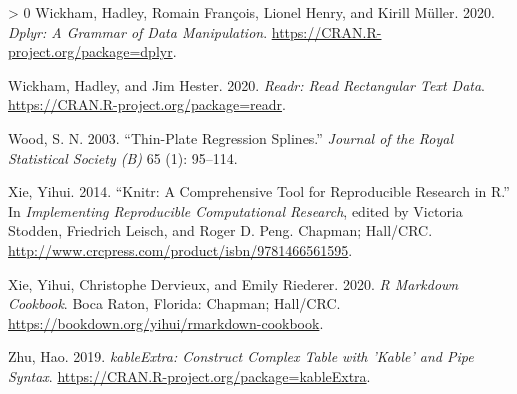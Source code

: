 \documentclass[12pt]{article}
\newlength{\cslhangindent}
\newenvironment{CSLReferences}[3] %
 {%
  \setlength{\parindent}{0pt}
  \ifodd #1 \everypar{\setlength{\hangindent}{\cslhangindent}}\ignorespaces\fi
  \ifnum #2 > 0
  \setlength{\parskip}{#2\baselineskip}
  \fi
 }%
 {}
\begin{document}
\begin{CSLReferences}{1}{0}
\leavevmode\hypertarget{ref-dplyr}{}%
Wickham, Hadley, Romain François, Lionel Henry, and Kirill Müller. 2020. \emph{Dplyr: A Grammar of Data Manipulation}. \url{https://CRAN.R-project.org/package=dplyr}.

\leavevmode\hypertarget{ref-readr}{}%
Wickham, Hadley, and Jim Hester. 2020. \emph{Readr: Read Rectangular Text Data}. \url{https://CRAN.R-project.org/package=readr}.

\leavevmode\hypertarget{ref-mgcv}{}%
Wood, S. N. 2003. {``Thin-Plate Regression Splines.''} \emph{Journal of the Royal Statistical Society (B)} 65 (1): 95--114.

\leavevmode\hypertarget{ref-knitr}{}%
Xie, Yihui. 2014. {``Knitr: A Comprehensive Tool for Reproducible Research in {R}.''} In \emph{Implementing Reproducible Computational Research}, edited by Victoria Stodden, Friedrich Leisch, and Roger D. Peng. Chapman; Hall/CRC. \url{http://www.crcpress.com/product/isbn/9781466561595}.

\leavevmode\hypertarget{ref-rmarkdown}{}%
Xie, Yihui, Christophe Dervieux, and Emily Riederer. 2020. \emph{R Markdown Cookbook}. Boca Raton, Florida: Chapman; Hall/CRC. \url{https://bookdown.org/yihui/rmarkdown-cookbook}.

\leavevmode\hypertarget{ref-kableExtra}{}%
Zhu, Hao. 2019. \emph{kableExtra: Construct Complex Table with 'Kable' and Pipe Syntax}. \url{https://CRAN.R-project.org/package=kableExtra}.

\end{CSLReferences}



\end{document}
